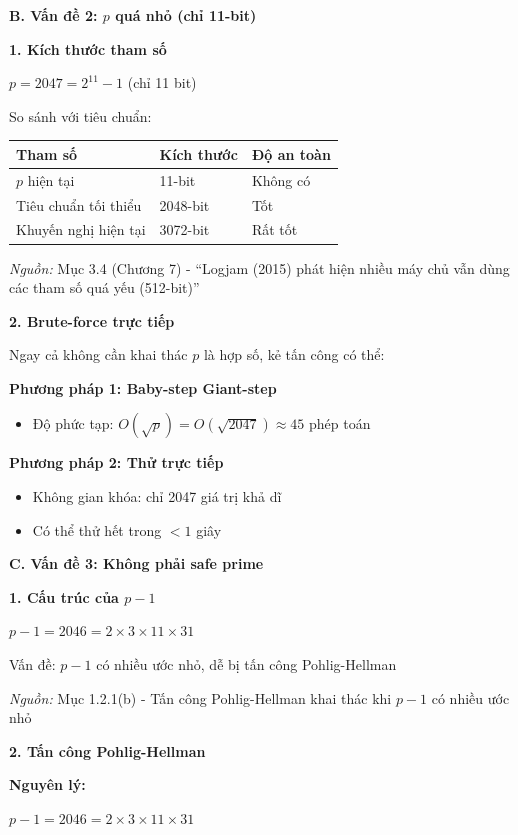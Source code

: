 \textbf{B. Vấn đề 2: $p$ quá nhỏ (chỉ 11-bit)}

\textbf{1. Kích thước tham số}

$p = 2047 = 2^{11} - 1$ (chỉ 11 bit)

So sánh với tiêu chuẩn:

\begin{center}
\begin{tabular}{|p{4cm}|p{3cm}|p{3cm}|}
\hline
\textbf{Tham số} & \textbf{Kích thước} & \textbf{Độ an toàn} \\
\hline
$p$ hiện tại & 11-bit & Không có \\
Tiêu chuẩn tối thiểu & 2048-bit & Tốt \\
Khuyến nghị hiện tại & 3072-bit & Rất tốt \\
\hline
\end{tabular}
\end{center}

\textit{Nguồn:} Mục 3.4 (Chương 7) - ``Logjam (2015) phát hiện nhiều máy chủ vẫn dùng các tham số quá yếu (512-bit)''

\textbf{2. Brute-force trực tiếp}

Ngay cả không cần khai thác $p$ là hợp số, kẻ tấn công có thể:

\textbf{Phương pháp 1: Baby-step Giant-step}
\begin{itemize}
    \item Độ phức tạp: $O(\sqrt{p}) = O(\sqrt{2047}) \approx 45$ phép toán
\end{itemize}

\textbf{Phương pháp 2: Thử trực tiếp}
\begin{itemize}
    \item Không gian khóa: chỉ 2047 giá trị khả dĩ
    \item Có thể thử hết trong $< 1$ giây
\end{itemize}


\textbf{C. Vấn đề 3: Không phải safe prime}

\textbf{1. Cấu trúc của $p-1$}

$p - 1 = 2046 = 2 \times 3 \times 11 \times 31$

Vấn đề: $p-1$ có nhiều ước nhỏ, dễ bị tấn công Pohlig-Hellman

\textit{Nguồn:} Mục 1.2.1(b) - Tấn công Pohlig-Hellman khai thác khi $p-1$ có nhiều ước nhỏ

\textbf{2. Tấn công Pohlig-Hellman}

\textbf{Nguyên lý:}

$p - 1 = 2046 = 2 \times 3 \times 11 \times 31$

